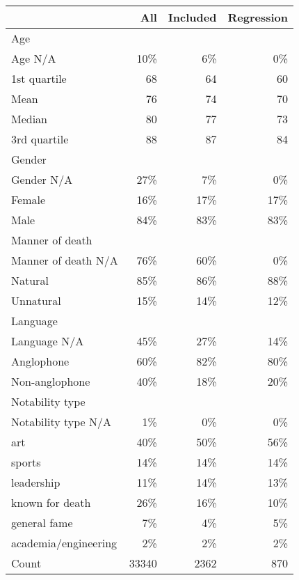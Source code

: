 \begin{tabular}{lrrr}
  \hline
 & All & Included & Regression \\ 
  \hline
Age &  &  &  \\ 
  Age N/A & 10\% & 6\% & 0\% \\ 
  1st quartile & 68 & 64 & 60 \\ 
  Mean & 76 & 74 & 70 \\ 
  Median & 80 & 77 & 73 \\ 
  3rd quartile & 88 & 87 & 84 \\ 
   \hline
Gender &  &  &  \\ 
  Gender N/A & 27\% & 7\% & 0\% \\ 
  Female & 16\% & 17\% & 17\% \\ 
  Male & 84\% & 83\% & 83\% \\ 
   \hline
Manner of death &  &  &  \\ 
  Manner of death N/A & 76\% & 60\% & 0\% \\ 
  Natural & 85\% & 86\% & 88\% \\ 
  Unnatural & 15\% & 14\% & 12\% \\ 
   \hline
Language &  &  &  \\ 
  Language N/A & 45\% & 27\% & 14\% \\ 
  Anglophone & 60\% & 82\% & 80\% \\ 
  Non-anglophone & 40\% & 18\% & 20\% \\ 
   \hline
Notability type &  &  &  \\ 
  Notability type N/A & 1\% & 0\% & 0\% \\ 
  art & 40\% & 50\% & 56\% \\ 
  sports & 14\% & 14\% & 14\% \\ 
  leadership & 11\% & 14\% & 13\% \\ 
  known for death & 26\% & 16\% & 10\% \\ 
  general fame & 7\% & 4\% & 5\% \\ 
  academia/engineering & 2\% & 2\% & 2\% \\ 
   \hline
Count & 33340 & 2362 & 870 \\ 
   \hline
\end{tabular}
